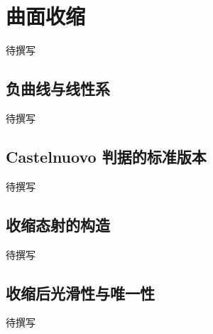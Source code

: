
% 
% 

\section{曲面收缩}
\label{g5:sec:2602}

待撰写

\subsection{负曲线与线性系}
\label{g5:subsec:2602:01}
待撰写

\subsection{Castelnuovo 判据的标准版本}
\label{g5:subsec:2602:02}
待撰写

\subsection{收缩态射的构造}
\label{g5:subsec:2602:03}
待撰写

\subsection{收缩后光滑性与唯一性}
\label{g5:subsec:2602:04}
待撰写
